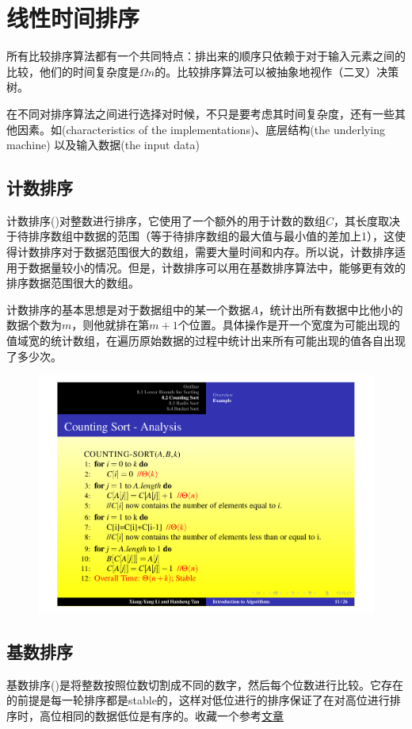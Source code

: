 \documentclass[]{report}
\begin{document}
	\chapter{线性时间排序}
		所有比较排序算法都有一个共同特点：排出来的顺序只依赖于对于输入元素之间的比较，他们的时间复杂度是$\Omega n$的。比较排序算法可以被抽象地视作（二叉）决策树。\par
		在不同对排序算法之间进行选择对时候，不只是要考虑其时间复杂度，还有一些其他因素。如(characteristics of the implementations)、底层结构(the underlying machine) 以及输入数据(the input data)
	\section{计数排序}
		计数排序({})对整数进行排序，它使用了一个额外的用于计数的数组$C$，其长度取决于待排序数组中数据的范围（等于待排序数组的最大值与最小值的差加上1），这使得计数排序对于数据范围很大的数组，需要大量时间和内存。所以说，计数排序适用于数据量较小的情况。但是，计数排序可以用在基数排序算法中，能够更有效的排序数据范围很大的数组。\par
		计数排序的基本思想是对于数据组中的某一个数据$A$，统计出所有数据中比他小的数据个数为$m$，则他就排在第$m+1$个位置。具体操作是开一个宽度为可能出现的值域宽的统计数组，在遍历原始数据的过程中统计出来所有可能出现的值各自出现了多少次。
		\begin{figure}[h!]
			\centering
			\begin{minipage}{40em}
				\centering
				\includegraphics[scale = 0.4]{images/Counting_Sort.pdf}
			\end{minipage}
		\end{figure}
	\section{基数排序}
		基数排序({})是将整数按照位数切割成不同的数字，然后每个位数进行比较。它存在的前提是每一轮排序都是stable的，这样对低位进行的排序保证了在对高位进行排序时，高位相同的数据低位是有序的。收藏一个参考\href{https://www.jianshu.com/p/134a0eed5e3a}{文章}
		\begin{algorithm}
			\caption{{} ($A$,$d$)}
		\end{algorithm}
\end{document}
